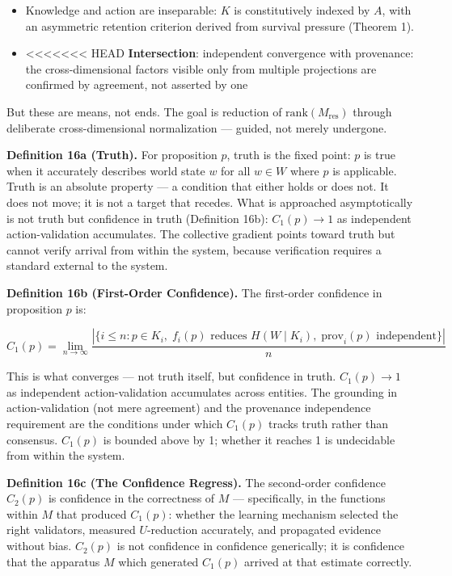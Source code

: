 \documentclass[
]{article}
\providecommand{\tightlist}{%
  \setlength{\itemsep}{0pt}\setlength{\parskip}{0pt}}
\begin{document}
\begin{itemize}
\tightlist
\item
  Knowledge and action are inseparable: \(K\) is constitutively indexed
  by \(A\), with an asymmetric retention criterion derived from survival
  pressure (Theorem 1).
\item
<<<<<<< HEAD
  \textbf{Intersection}: independent convergence with provenance: the
  cross-dimensional factors visible only from multiple projections are
  confirmed by agreement, not asserted by one
\end{itemize}

But these are means, not ends. The goal is reduction of
\(\text{rank}(M_{\text{res}})\) through deliberate cross-dimensional
normalization --- guided, not merely undergone.

\textbf{Definition 16a (Truth).} For proposition \(p\), truth is the
fixed point: \(p\) is true when it accurately describes world state
\(w\) for all \(w \in W\) where \(p\) is applicable. Truth is an
absolute property --- a condition that either holds or does not. It does
not move; it is not a target that recedes. What is approached
asymptotically is not truth but confidence in truth (Definition 16b):
\(C_1(p) \to 1\) as independent action-validation accumulates. The
collective gradient points toward truth but cannot verify arrival from
within the system, because verification requires a standard external to
the system.

\textbf{Definition 16b (First-Order Confidence).} The first-order
confidence in proposition \(p\) is:

\[C_1(p) = \lim_{n \to \infty} \frac{\left|\{i \leq n : p \in K_i,\; f_i(p) \text{ reduces } H(W \mid K_i),\; \text{prov}_i(p) \text{ independent}\}\right|}{n}\]

This is what converges --- not truth itself, but confidence in truth.
\(C_1(p) \to 1\) as independent action-validation accumulates across
entities. The grounding in action-validation (not mere agreement) and
the provenance independence requirement are the conditions under which
\(C_1(p)\) tracks truth rather than consensus. \(C_1(p)\) is bounded
above by 1; whether it reaches 1 is undecidable from within the system.

\textbf{Definition 16c (The Confidence Regress).} The second-order
confidence \(C_2(p)\) is confidence in the correctness of \(M\) ---
specifically, in the functions within \(M\) that produced \(C_1(p)\):
whether the learning mechanism selected the right validators, measured
\(U\)-reduction accurately, and propagated evidence without bias.
\(C_2(p)\) is not confidence in confidence generically; it is confidence
that the apparatus \(M\) which generated \(C_1(p)\) arrived at that
estimate correctly.
\end{document}
